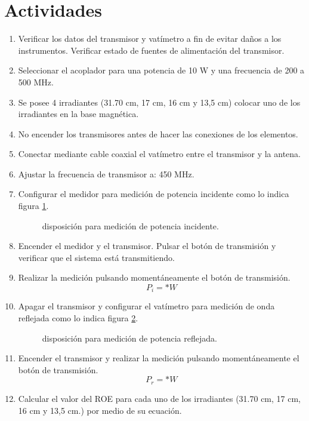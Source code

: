   \section{Actividades}
    \begin{enumerate}
      \item Verificar los datos del transmisor y vatímetro a fin de evitar daños a los instrumentos. Verificar estado de fuentes de alimentación del transmisor.
      \item Seleccionar el acoplador para una potencia de 10 W y una frecuencia de 200 a 500 MHz.
      \item Se posee 4 irradiantes (31.70 cm, 17 cm, 16 cm y 13,5 cm) colocar uno de los irradiantes en la base magnética.
      \item No encender los transmisores antes de hacer las conexiones de los elementos.
      \item Conectar mediante cable coaxial el vatímetro entre el transmisor y la antena.
      \item Ajustar la frecuencia de transmisor a: 450 MHz.
      \item Configurar el medidor para medición de potencia incidente como lo indica figura \ref{fig:power_meas.forward}.
        \begin{figure}[!ht]
          \centering
          
          \caption{disposición para medición de potencia incidente.}
          \label{fig:power_meas.forward}
        \end{figure}
      \item Encender el medidor y el transmisor. Pulsar el botón de transmisión y verificar que el sistema está transmitiendo.
      \item Realizar la medición pulsando momentáneamente el botón de transmisión.
        \begin{equation*}
          P_i = *W
        \end{equation*}
      \item Apagar el transmisor y configurar el vatímetro para medición de onda reflejada como lo indica figura
        \ref{fig:power_meas.reverse}.
        \begin{figure}[!ht]
          \centering
          
          \caption{disposición para medición de potencia reflejada.}
          \label{fig:power_meas.reverse}
        \end{figure}
      \item Encender el transmisor y realizar la medición pulsando momentáneamente el botón de transmisión.
        \begin{equation*}
          P_r = *W
        \end{equation*}
      \item Calcular el valor del ROE para cada uno de los irradiantes (31.70 cm, 17 cm, 16 cm y 13,5 cm.) por medio de
        su ecuación.


\end{enumerate}
